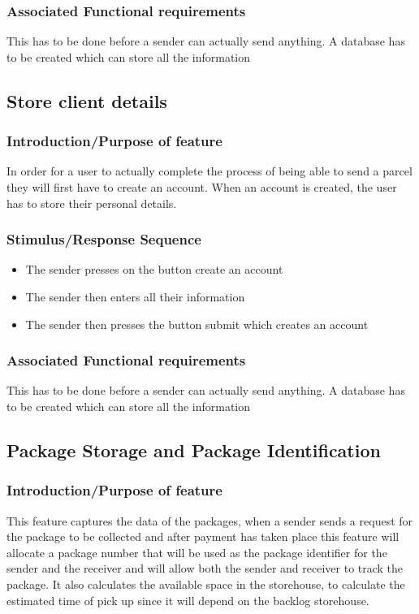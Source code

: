 \documentclass[paper=a4, fontsize=11pt]{scrartcl} %
\numberwithin{equation}{section} %
\numberwithin{figure}{section} %
\numberwithin{table}{section} %
\begin{document}
\subsubsection{Associated Functional requirements}
This has to be done before a sender can actually send anything. A database has to be created which can store all the information

\subsection{Store client details}
\subsubsection{Introduction/Purpose of feature}
In order for a user to actually complete the process of being able to send a parcel they will first have to create an account. When an account is created, the user has to store their personal details.
\subsubsection{Stimulus/Response Sequence}
\begin{itemize}
			\item The sender presses on the button create an account
			\item The sender then enters all their information 
			\item The sender then presses the button submit which creates an account 
\end{itemize}
	

\subsubsection{Associated Functional requirements}
This has to be done before a sender can actually send anything. A database has to be created which can store all the information

\subsection{Package Storage and Package Identification}
\subsubsection{Introduction/Purpose of feature}
This feature captures the data of the packages, when a sender sends a request for the package to be collected and after payment has taken place this feature will allocate a package number that will be used as the package identifier for the sender and the receiver and will allow both the sender and receiver to track the package. It also calculates the available space in the storehouse, to calculate the estimated time of pick up since it will depend on the backlog storehouse.
\end{document}
